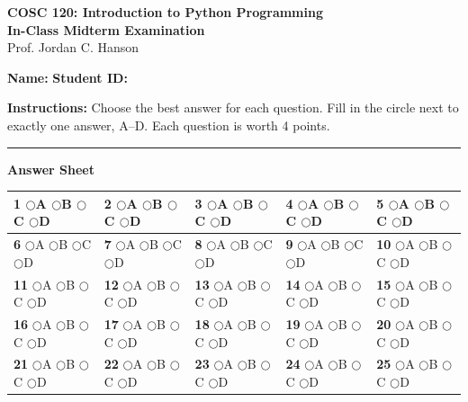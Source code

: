 \documentclass[11pt]{article}
\newcommand{\bubblecell}[1]{%
    {\scriptsize
    \textbf{#1}\;
    \(\bigcirc\)A\;
    \(\bigcirc\)B\;
    \(\bigcirc\)C\;
    \(\bigcirc\)D}%
}
\begin{document}
\begin{center}
{\Large\bfseries COSC 120: Introduction to Python Programming}\\[2pt]
{\large\bfseries In-Class Midterm Examination}\\[3pt]
Prof. Jordan C. Hanson
\end{center}

\vspace{0.1cm}

\noindent
\textbf{Name:} \hrulefill
\hspace{0.5cm}
\textbf{Student ID:}
\fbox{\rule{0pt}{1.8ex}\hspace{4cm}}

\vspace{0.2cm}

\noindent
\textbf{Instructions:}
Choose the best answer for each question.
Fill in the circle next to exactly one answer, A--D.
Each question is worth 4 points.

\vspace{0.15cm}
\hrule
\vspace{0.2cm}

\begin{center}
{\large\bfseries Answer Sheet}
\end{center}

\small
\renewcommand{\arraystretch}{1.3}

\begin{center}
\begin{tabular}{
|m{}
|m{}
|m{}
|m{}
|m{}|}
\hline
\bubblecell{1} &
\bubblecell{2} &
\bubblecell{3} &
\bubblecell{4} &
\bubblecell{5} \\ \hline

\bubblecell{6} &
\bubblecell{7} &
\bubblecell{8} &
\bubblecell{9} &
\bubblecell{10} \\ \hline

\bubblecell{11} &
\bubblecell{12} &
\bubblecell{13} &
\bubblecell{14} &
\bubblecell{15} \\ \hline

\bubblecell{16} &
\bubblecell{17} &
\bubblecell{18} &
\bubblecell{19} &
\bubblecell{20} \\ \hline

\bubblecell{21} &
\bubblecell{22} &
\bubblecell{23} &
\bubblecell{24} &
\bubblecell{25} \\ \hline
\end{tabular}
\end{center}
\end{document}

